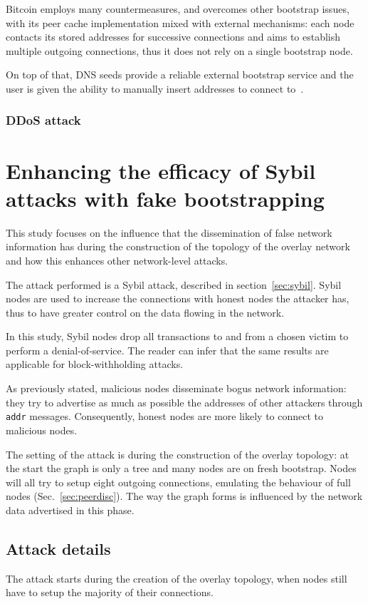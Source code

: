 \documentclass[12pt, letterpaper, twoside]{article}
\begin{document}
Bitcoin employs many countermeasures, and overcomes other bootstrap issues, with its peer cache implementation mixed with external mechanisms: each node contacts its stored addresses for successive connections and aims to establish multiple outgoing connections, thus it does not rely on a single bootstrap node.

On top of that, DNS seeds provide a reliable external bootstrap service and the user is given the ability to manually insert addresses to connect to~\cite{mahmoud_netsec_boot}.


\subsubsection{DDoS attack}\label{sec:ddos}



\section{Enhancing the efficacy of Sybil attacks with fake bootstrapping}\label{sec:atk}
This study focuses on the influence that the dissemination of false network information has during the construction of the topology of the overlay network and how this enhances other network-level attacks.

The attack performed is a Sybil attack, described in section~\ref{sec:sybil}. Sybil nodes are used to increase the connections with honest nodes the attacker has, thus to have greater control on the data flowing in the network.  

In this study, Sybil nodes drop all transactions to and from a chosen victim to perform a denial-of-service. The reader can infer that the same results are applicable for block-withholding attacks.

As previously stated, malicious nodes disseminate bogus network information: they try to advertise as much as possible the addresses of other attackers through \texttt{addr} messages. Consequently, honest nodes are more likely to connect to malicious nodes.

The setting of the attack is during the construction of the overlay topology: at the start the graph is only a tree and many nodes are on fresh bootstrap. Nodes will all try to setup eight outgoing connections, emulating the behaviour of full nodes (Sec.~\ref{sec:peerdisc}). The way the graph forms is influenced by the network data advertised in this phase.

\subsection{Attack details}\label{sec:atkdetails}
The attack starts during the creation of the overlay topology, when nodes still have to setup the majority of their connections.
\end{document}
